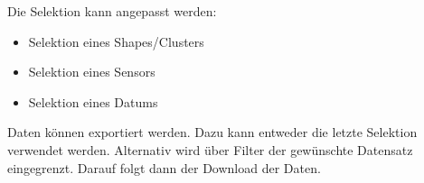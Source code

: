         Die Selektion kann angepasst werden:
        \begin{itemize}
            \item Selektion eines Shapes/Clusters
            \item Selektion eines Sensors
            \item Selektion eines Datums
        \end{itemize}

        Daten können exportiert werden. Dazu kann entweder die letzte Selektion verwendet werden. Alternativ wird über Filter der gewünschte Datensatz eingegrenzt. Darauf folgt dann der Download der Daten.


        
